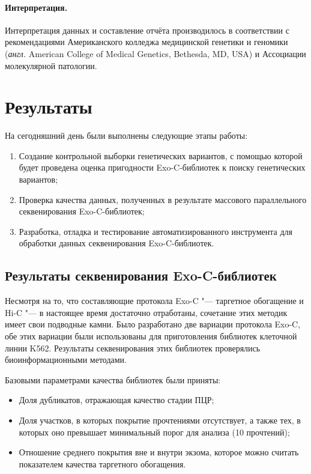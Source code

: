 \documentclass[a4paper,12pt]{article}
\begin{document}
\paragraph{Интерпретация.}
Интерпретация данных и составление отчёта производилось в соответствии с рекомендациями Американского колледжа медицинской генетики и геномики (\textit{англ.} American College of Medical Genetics, Bethesda, MD, USA) и Ассоциации молекулярной патологии\cite{Richards_2015}.

\section{Результаты}

На сегодняшний день были выполнены следующие этапы работы:

\begin{enumerate}
\item Создание контрольной выборки генетических вариантов, с помощью которой будет проведена оценка пригодности Exo-C-библиотек к поиску генетических вариантов;
\item Проверка качества данных, полученных в результате массового параллельного секвенирования Exo-C-библиотек;
\item Разработка, отладка и тестирование автоматизированного инструмента для обработки данных секвенирования Exo-C-библиотек.
\end{enumerate}

\subsection{Результаты секвенирования Exo-C-библиотек}

Несмотря на то, что составляющие протокола Exo-C "--- таргетное обогащение и Hi-C "--- в настоящее время достаточно отработаны, сочетание этих методик имеет свои подводные камни.
Было разработано две вариации протокола Exo-C, обе этих вариации были использованы для приготовления библиотек клеточной линии K562.
Результаты секвенирования этих библиотек проверялись биоинформационными методами.

Базовыми параметрами качества библиотек были приняты:

\begin{itemize}
\item Доля дубликатов, отражающая качество стадии ПЦР;
\item Доля участков, в которых покрытие прочтениями отсутствует, а также тех, в которых оно превышает минимальный порог для анализа (10 прочтений);
\item Отношение среднего покрытия вне и внутри экзома, которое можно считать показателем качества таргетного обогащения.
\end{itemize}
\end{document}
